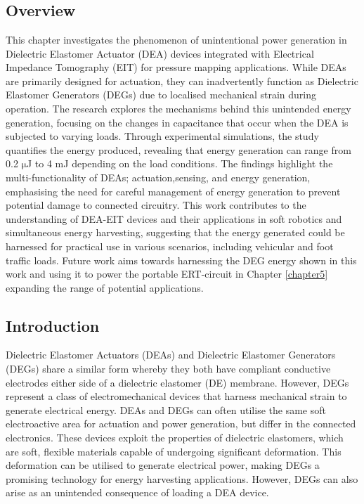 \chapter{\chapviiname}
\label{chapter7}
\section*{Overview}
This chapter investigates the phenomenon of unintentional power generation in Dielectric Elastomer Actuator (DEA) devices integrated with Electrical Impedance Tomography (EIT) for pressure mapping applications. While DEAs are primarily designed for actuation, they can inadvertently function as Dielectric Elastomer Generators (DEGs) due to localised mechanical strain during operation. The research explores the mechanisms behind this unintended energy generation, focusing on the changes in capacitance that occur when the DEA is subjected to varying loads. Through experimental simulations, the study quantifies the energy produced, revealing that energy generation can range from 0.2 $\mathrm{\mu}$J to 4 mJ depending on the load conditions. The findings highlight the multi-functionality of DEAs; actuation,sensing, and energy generation, emphasising the need for careful management of energy generation to prevent potential damage to connected circuitry. This work contributes to the understanding of DEA-EIT devices and their applications in soft robotics and simultaneous energy harvesting, suggesting that the energy generated could be harnessed for practical use in various scenarios, including vehicular and foot traffic loads. Future work aims towards harnessing the DEG energy shown in this work and using it to power the portable ERT-circuit in Chapter \ref{chapter5} expanding the range of potential applications.



\section{Introduction} %
\label{sec:introduction}
Dielectric Elastomer Actuators (DEAs) and Dielectric Elastomer Generators (DEGs) share a similar form whereby they both have compliant conductive electrodes either side of a dielectric elastomer (DE) membrane. However, DEGs represent a class of electromechanical devices that harness mechanical strain to generate electrical energy. DEAs and DEGs can often utilise the same soft electroactive area for actuation and power generation, but differ in the connected electronics. These devices exploit the properties of dielectric elastomers, which are soft, flexible materials capable of undergoing significant deformation. This deformation can be utilised to generate electrical power, making DEGs a promising technology for energy harvesting applications. However, DEGs can also arise as an unintended consequence of loading a DEA device.

